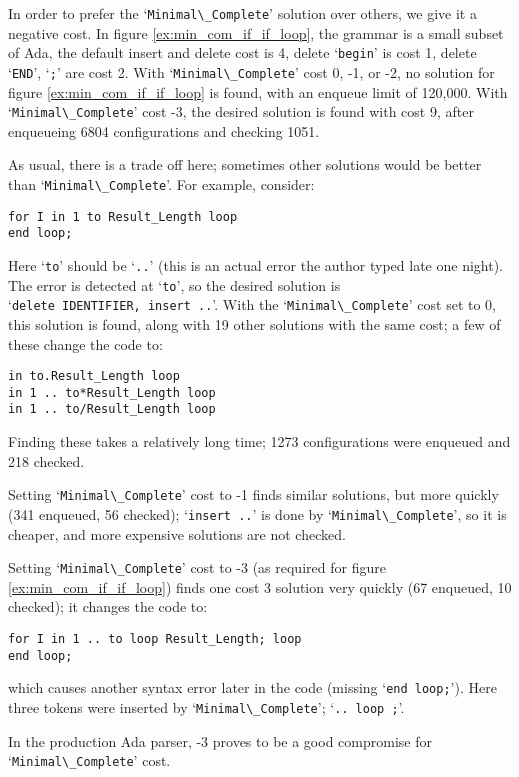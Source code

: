 \documentclass{article}
\newcommand{\code}[1]{`\lstinline|#1|'}
\begin{document}
In order to prefer the \code{Minimal\_Complete} solution over others,
we give it a negative cost. In figure \ref{ex:min_com_if_if_loop}, the
grammar is a small subset of Ada, the
default insert and delete cost is 4, delete \code{begin} is cost 1,
delete \code{END}, \code{;} are cost 2. With \code{Minimal\_Complete}
cost 0, -1, or -2, no solution for figure \ref{ex:min_com_if_if_loop}
is found, with an enqueue limit of 120,000. With
\code{Minimal\_Complete} cost -3, the desired solution is found with
cost 9, after enqueueing 6804 configurations and checking 1051.

As usual, there is a trade off here; sometimes other solutions would
be better than \code{Minimal\_Complete}. For example, consider:
\begin{lstlisting}
for I in 1 to Result_Length loop
end loop;
\end{lstlisting}
Here \code{to} should be \code{..} (this is an actual error the author
typed late one night). The error is detected at \code{to}, so the
desired solution is\\ \code{delete IDENTIFIER, insert ..}. With the
\code{Minimal\_Complete} cost set to 0, this solution is found, along
with 19 other solutions with the same cost; a few of these change the
code to:

\begin{lstlisting}
in to.Result_Length loop
in 1 .. to*Result_Length loop
in 1 .. to/Result_Length loop
\end{lstlisting}

Finding these takes a relatively long time; 1273 configurations
were enqueued and 218 checked.

Setting \code{Minimal\_Complete} cost to -1 finds similar solutions,
but more quickly (341 enqueued, 56 checked); \code{insert ..} is done
by \code{Minimal\_Complete}, so it is cheaper, and more expensive
solutions are not checked.

Setting \code{Minimal\_Complete} cost to -3 (as required for
figure \ref{ex:min_com_if_if_loop}) finds one cost 3 solution very
quickly (67 enqueued, 10 checked); it changes the code to:
\begin{lstlisting}
for I in 1 .. to loop Result_Length; loop
end loop;
\end{lstlisting}
which causes another syntax error later in the code (missing
\code{end loop;}). Here three tokens were inserted by
\code{Minimal\_Complete}; \code{.. loop ;}.

In the production Ada parser, -3 proves to be a good compromise for\\
\code{Minimal\_Complete} cost.
\end{document}

